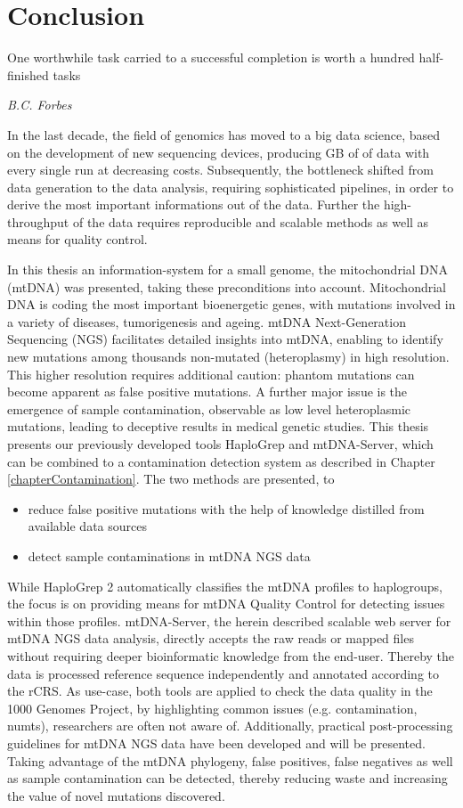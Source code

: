 \chapter{Conclusion}
\label{chap:conclusion}

\epigraph{One worthwhile task carried to a successful completion is worth a hundred half-finished tasks}{\textit{B.C. Forbes}}

In the last decade, the  field of genomics has moved to a big data science, based on the development of new sequencing devices, producing GB of of data with every single run at decreasing costs. Subsequently, the bottleneck shifted from data generation to the data analysis, requiring sophisticated pipelines, in order to derive the most important informations out of the data. Further the high-throughput of the data requires reproducible and scalable methods as well as means for quality control. 

In this thesis an information-system for a small genome, the mitochondrial DNA (mtDNA) was presented, taking these preconditions into account. Mitochondrial DNA is coding the most important bioenergetic genes, with mutations involved in a variety of diseases, tumorigenesis and ageing. mtDNA Next-Generation Sequencing (NGS) facilitates detailed insights into mtDNA, enabling to identify new mutations among thousands non-mutated (heteroplasmy) in high resolution. This higher resolution requires additional caution: phantom mutations can become apparent as false positive mutations. A further major issue is the emergence of sample contamination, observable as low level heteroplasmic mutations, leading to deceptive results in medical genetic studies.
This thesis presents our previously developed tools HaploGrep and mtDNA-Server, which can be combined to a contamination detection system as described in Chapter \ref{chapterContamination}. The two methods are presented, to
\begin{itemize}
\item reduce false positive mutations with the help of knowledge distilled from available data sources  
\item detect sample contaminations in mtDNA NGS data
\end{itemize}
While HaploGrep 2 automatically classifies the mtDNA profiles to haplogroups, the focus is on providing means for mtDNA Quality Control for detecting issues within those profiles. 
mtDNA-Server, the herein described scalable web server for mtDNA NGS data analysis, directly accepts the raw reads or mapped files without requiring deeper bioinformatic knowledge from the end-user. Thereby the data is processed reference sequence independently and annotated according to the rCRS. 
As use-case, both tools are applied to check the data quality in the 1000 Genomes Project, by highlighting common issues (e.g. contamination, numts), researchers are often not aware of. Additionally, practical post-processing guidelines for mtDNA NGS data have been developed and will be presented. Taking advantage of the mtDNA phylogeny, false positives, false negatives as well as sample contamination can be detected, thereby reducing waste and increasing the value of novel mutations discovered.
